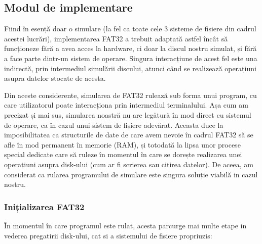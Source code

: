 \bigskip


\subsection{Modul de implementare}

Fiind în esență doar o simulare (la fel ca toate cele 3 sisteme de fișiere din cadrul acestei lucrări), implementarea FAT32 a trebuit adaptată astfel încât să funcționeze fără a avea acces la hardware, ci doar la discul nostru simulat, și fără a face parte dintr-un sistem de operare. Singura interacțiune de acest fel este una indirectă, prin intermediul simulării discului, atunci când se realizează operațiuni asupra datelor stocate de acesta.

Din aceste considerente, simularea de FAT32 rulează sub forma unui program, cu care utilizatorul poate interacționa prin intermediul terminalului. Așa cum am precizat și mai sus, simularea noastră nu are legătură în mod direct cu sistemul de operare, ca în cazul unui sistem de fișiere adevărat. Aceasta duce la imposibilitatea ca structurile de date de care avem nevoie în cadrul FAT32 să se afle în mod permanent în memorie (RAM), și totodată la lipsa unor procese special dedicate care să ruleze în momentul în care se dorește realizarea unei operațiuni asupra disk-ului (cum ar fi scrierea sau citirea datelor). De aceea, am considerat ca rularea programului de simulare este singura soluție viabilă in cazul nostru.


\subsubsection{Inițializarea FAT32}

În momentul în care programul este rulat, acesta parcurge mai multe etape in vederea pregatirii disk-ului, cat si a sistemului de fisiere propriuzis:

